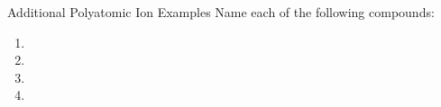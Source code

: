 \documentclass[handout]{beamer}
\begin{document}

\begin{frame}[s]{Additional Polyatomic Ion Examples}
	Name each of the following compounds:
	\begin{enumerate}
		\item {} \vfill

		\item {} \vfill

		\item {} \vfill

		\item {} \vfill
	\end{enumerate}
\end{frame}
\end{document}
